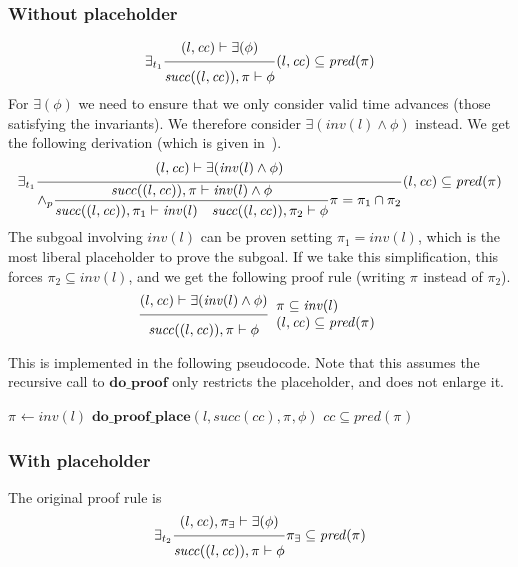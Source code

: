\documentclass{article}
\newcommand{\proofrule}[3][]{#1 \frac{\raisebox{.7ex}{\normalsize{$#2$}}}
  {\raisebox{-1.0ex}{\normalsize{$#3$}}}}
\newcommand{\placeholder}[1][]{\pi_{#1}}
\newcommand{\loc}{l}
\newcommand{\region}{\mathit{cc}}
\newcommand{\suc}{\mathit{succ}}
\newcommand{\pre}{\mathit{pred}}
\newcommand{\inv}{\mathit{inv}}
\newcommand{\method}[1]{\ensuremath{\mathbf{#1}}}
\begin{document}
\subsubsection{Without placeholder}
\[
\proofrule[\exists_{t_1}]
{(\loc, \region) \vdash \exists(\phi)}
{\suc((\loc, \region)), \placeholder \vdash \phi}
(\loc, \region) \subseteq \pre(\placeholder)
\]
%
For $\exists(\phi)$ we need to ensure that we only consider valid time advances (those satisfying the invariants).
We therefore consider $\exists(\inv(\loc) \land \phi)$ instead.
We get the following derivation (which is given in~\cite[Appendix C.2]{FC:14}).
\[
\proofrule[\exists_{t_1}]
{(\loc, \region) \vdash \exists(\inv(\loc) \land \phi)}
{
  \proofrule[\land_p]
  {\suc((\loc, \region)), \placeholder \vdash \inv(\loc) \land \phi}
  {\suc((\loc, \region)), \placeholder[1] \vdash \inv(\loc)
  \quad \suc((\loc, \region)), \placeholder[2] \vdash \phi}
  \placeholder = \placeholder[1] \cap \placeholder[2]
}
(\loc, \region) \subseteq \pre(\placeholder)
\]
The subgoal involving $\inv(\loc)$ can be proven setting $\placeholder[1] = \inv(\loc)$, which is
the most liberal placeholder to prove the subgoal. If we take this simplification, this forces $\placeholder[2] \subseteq \inv(\loc)$,
and we get the following proof rule (writing $\placeholder$ instead of $\placeholder[2]$).
\[
\proofrule
{(\loc, \region) \vdash \exists(\inv(\loc) \land \phi)}
{\suc((\loc, \region)), \placeholder \vdash \phi}
\begin{array}{l}
\placeholder \subseteq \inv(\loc) \\
(\loc, \region) \subseteq \pre(\placeholder)
\end{array}
\]

This is implemented in the following pseudocode. Note that this assumes the recursive
call to \method{do\_proof} only restricts the placeholder, and does not enlarge it.

\begin{algorithm}[H]
\caption{$\method{do\_proof\_exists}(\loc, \region, \exists(\phi))$}
\begin{algorithmic}
\STATE $\placeholder \gets \inv(\loc)$ 
\STATE $\method{do\_proof\_place}(\loc, \suc(\region), \placeholder, \phi)$
\RETURN $\region \subseteq \pre(\placeholder)$
\end{algorithmic}
\end{algorithm}

\subsubsection{With placeholder}
The original proof rule is
\[
%
\proofrule[\exists_{t_2}]
{(\loc, \region), \placeholder[\exists] \vdash \exists(\phi)}
{\suc((\loc, \region)), \placeholder \vdash \phi}
\placeholder[\exists] \subseteq \pre(\placeholder)
\]
\end{document}
